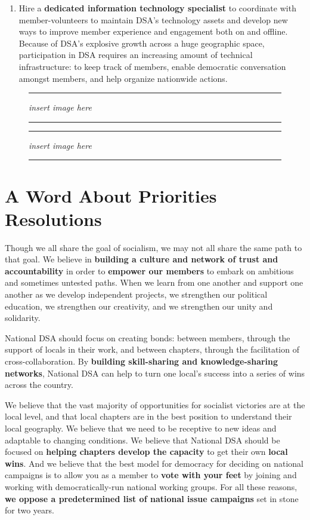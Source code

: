 \documentclass[10pt]{memoir}
\begin{document}
\begin{enumerate}
\item{Hire a \textbf{dedicated information technology specialist} to coordinate with member-volunteers to maintain DSA's technology assets and develop new ways to improve member experience and engagement both on and offline. Because of DSA's explosive growth across a huge geographic space, participation in DSA requires an increasing amount of technical infrastructure: to keep track of members, enable democratic conversation amongst members, and help organize nationwide actions.}
\end{enumerate}

\begin{figure}[h!]
\hrule
\vspace{1.8in}
\center\huge\emph{insert image here}
\vspace{1.8in}

\hrule
\end{figure}
\vfill
\pagebreak


\begin{figure}[h!]
\hrule
\vspace{3in}
\center\huge\emph{insert image here}
\vspace{3in}

\hrule
\end{figure}
\vfill
\pagebreak

\section*{A Word About Priorities Resolutions}

Though we all share the goal of socialism, we may not all share the same path to that goal. We believe in \textbf{building a culture and network of trust and accountability} in order to \textbf{empower our members} to embark on ambitious and sometimes untested paths. When we learn from one another and support one another as we develop independent projects, we strengthen our political education, we strengthen our creativity, and we strengthen our unity and solidarity. 

National DSA should focus on creating bonds: between members, through the support of locals in their work, and between chapters, through the facilitation of cross-collaboration. By \textbf{building skill-sharing and knowledge-sharing networks}, National DSA can help to turn one local's success into a series of wins across the country. 

We believe that the vast majority of opportunities for socialist victories are at the local level, and that local chapters are in the best position to understand their local geography. We believe that we need to be receptive to new ideas and adaptable to changing conditions. We believe that National DSA should be focused on \textbf{helping chapters develop the capacity} to get their own \textbf{local wins}. And we believe that the best model for democracy for deciding on national campaigns is to allow you as a member to \textbf{vote with your feet} by joining and working with democratically-run national working groups. For all these reasons, \linebreak\textbf{we oppose a predetermined list of national issue campaigns} set in stone for two years.
\end{document}
